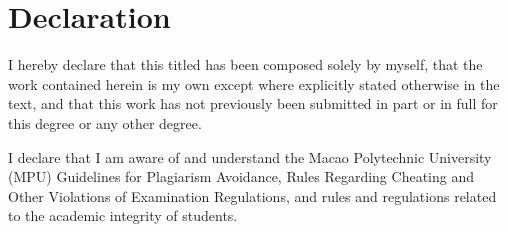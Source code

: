 \chapter{Declaration}

I hereby declare that this {\InsertThesisType} titled {\bf\InsertTitle} has been composed solely by myself, that the work contained herein is my own except where explicitly stated otherwise in the text, and that this work has not previously been submitted in part or in full for this degree or any other degree.

I declare that I am aware of and understand the Macao Polytechnic University (MPU) Guidelines for Plagiarism Avoidance, Rules Regarding Cheating and Other Violations of Examination Regulations, and rules and regulations related to the academic integrity of students.

\vspace*{1in}

\noindent
\hspace*{0.5\linewidth}{\bf\InsertStudentName}

\medskip

\onehalfspacing
\noindent
\hspace*{0.5\linewidth}{\InsertAcademicUnit}\\
\hspace*{0.5\linewidth}{\InsertUniversity}

\endinput
